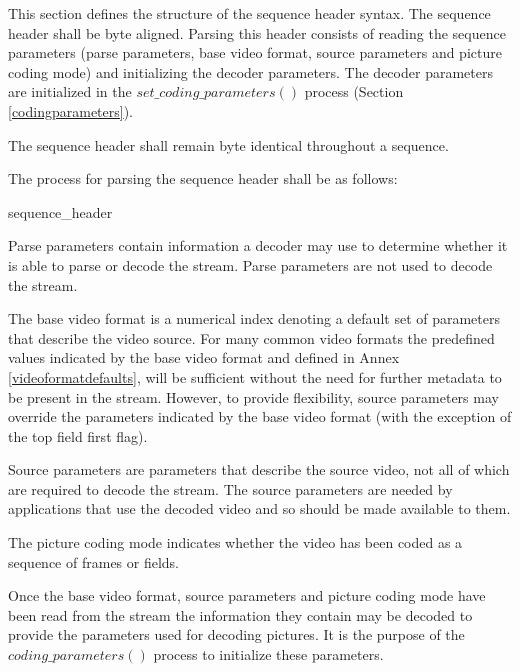 This section defines the structure of the sequence header syntax. 
The sequence header shall be byte aligned. 
Parsing this header consists of reading the sequence parameters 
(parse parameters, base video format, source parameters and 
picture coding mode) and initializing the decoder parameters. The decoder 
parameters are initialized in the $set\_coding\_parameters()$ process (Section 
\ref{codingparameters}).

The sequence header shall remain byte identical throughout a sequence.

The process for parsing the sequence header shall be as follows:

\begin{pseudo}{sequence\_header}{}
\bsRET{\VideoParams}
\end{pseudo}

Parse parameters contain information a decoder may use to determine whether 
it is able to parse or decode the stream. Parse parameters are not used to decode the stream.

The base video format is a numerical index denoting a default set of parameters 
that describe the video source. For many common video formats the predefined 
values indicated by the base video format and defined in Annex \ref{videoformatdefaults}, will be sufficient 
without the need for further metadata to be present in the stream. However, to provide 
flexibility, source parameters may override the parameters indicated 
by the base video format (with the exception of the top field first flag).

Source parameters are parameters that describe the source video, not all of 
which are required to decode the stream. The source parameters are needed by 
applications that use the decoded video and so should be made available to them.

The picture coding mode indicates whether the video has been coded as a sequence 
of frames or fields.

Once the base video format, source parameters and picture coding mode have 
been read from the stream the information they contain may be decoded to 
provide the parameters used for decoding pictures. It is the purpose of the 
$coding\_parameters()$ process to initialize these parameters.

